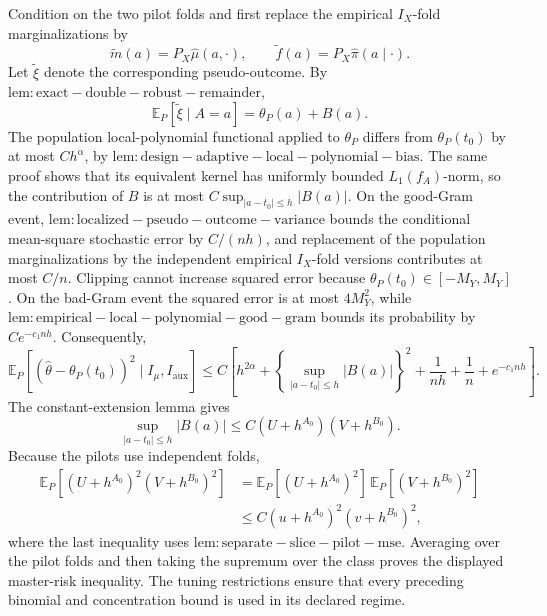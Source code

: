 Condition on the two pilot folds and first replace the empirical \(I_X\)-fold marginalizations by
\[
\widetilde m(a)=P_X\widehat\mu(a,\cdot),
\qquad
\widetilde f(a)=P_X\widehat\pi(a\mid\cdot).
\]
Let \(\widetilde\xi\) denote the corresponding pseudo-outcome.  By \(\mathrm{lem:exact-double-robust-remainder}\),
\[
\mathbb E_P[\widetilde\xi\mid A=a]=\theta_P(a)+B(a).
\]
The population local-polynomial functional applied to \(\theta_P\) differs from \(\theta_P(t_0)\) by at most \(Ch^\alpha\), by \(\mathrm{lem:design-adaptive-local-polynomial-bias}\).  The same proof shows that its equivalent kernel has uniformly bounded \(L_1(f_A)\)-norm, so the contribution of \(B\) is at most \(C\sup_{|a-t_0|\le h}|B(a)|\).  On the good-Gram event, \(\mathrm{lem:localized-pseudo-outcome-variance}\) bounds the conditional mean-square stochastic error by \(C/(nh)\), and replacement of the population marginalizations by the independent empirical \(I_X\)-fold versions contributes at most \(C/n\).  Clipping cannot increase squared error because \(\theta_P(t_0)\in[-M_Y,M_Y]\).  On the bad-Gram event the squared error is at most \(4M_Y^2\), while \(\mathrm{lem:empirical-local-polynomial-good-gram}\) bounds its probability by \(Ce^{-c_1nh}\).  Consequently,
\[
\mathbb E_P[(\widehat\theta-\theta_P(t_0))^2\mid I_\mu,I_{\mathrm{aux}}]
\le C\left[h^{2\alpha}+\left\{\sup_{|a-t_0|\le h}|B(a)|\right\}^2+\frac1{nh}+\frac1n+e^{-c_1nh}\right].
\]
The constant-extension lemma gives
\[
\sup_{|a-t_0|\le h}|B(a)|\le C(U+h^{A_0})(V+h^{B_0}).
\]
Because the pilots use independent folds,
\[
\begin{aligned}
\mathbb E_P[(U+h^{A_0})^2(V+h^{B_0})^2]
&=\mathbb E_P[(U+h^{A_0})^2]\,\mathbb E_P[(V+h^{B_0})^2]\\
&\le C(u+h^{A_0})^2(v+h^{B_0})^2,
\end{aligned}
\]
where the last inequality uses \(\mathrm{lem:separate-slice-pilot-mse}\).  Averaging over the pilot folds and then taking the supremum over the class proves the displayed master-risk inequality.  The tuning restrictions ensure that every preceding binomial and concentration bound is used in its declared regime.